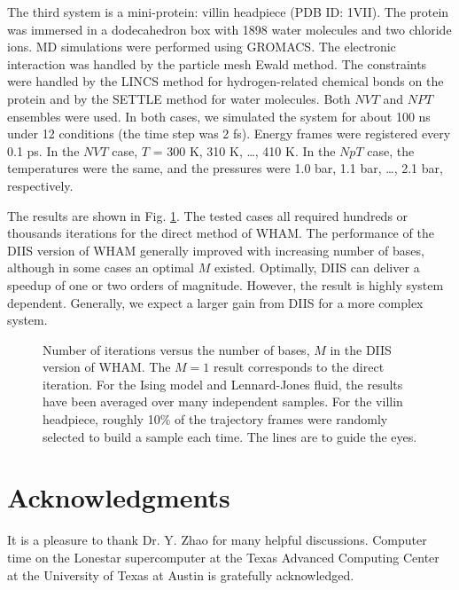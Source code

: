 \documentclass[aip,jcp,preprint,superscriptaddress]{revtex4-1}
\begin{document}
The third system is a mini-protein:
villin headpiece\cite{duan1998}
(PDB ID: 1VII).
%
The protein was immersed in
a dodecahedron box with 1898 water molecules and two chloride ions.
%
MD simulations were performed
using GROMACS\cite{
  berendsen1995, *lindahl2001, *vanderspoel2005, *hess2008}.
%
The electronic interaction was
handled by the particle mesh Ewald method\cite{
  essmann1995}.
%
The constraints were handled by the LINCS method\cite{
  hess1997}
for hydrogen-related chemical bonds on the protein
and by the SETTLE method\cite{
  miyamoto1992}
for water molecules.
%
Both $NVT$ and $NPT$ ensembles were used.
%
In both cases, we simulated the system
for about {\color{red} 100} ns
under 12 conditions
(the time step was 2 fs).
%
Energy frames were registered every 0.1 ps.
%
In the $NVT$ case,
$T$ = 300 K, 310 K, \dots, 410 K.
%
In the $NpT$ case,
the temperatures were the same,
and the pressures were
1.0 bar, 1.1 bar, \dots, 2.1 bar,
respectively.



The results are shown in Fig. \ref{fig:niter}.
%
The tested cases
all required hundreds or thousands iterations
for the direct method of WHAM.
%
The performance of the DIIS version of WHAM
generally improved with increasing number of bases,
although in some cases an optimal $M$ existed.
%
Optimally, DIIS can deliver a speedup of one or two orders of magnitude.
%
However, the result is highly system dependent.
%
Generally, we expect a larger gain from DIIS
for a more complex system.




\begin{figure}[h]
  \caption{
    \label{fig:niter}
    Number of iterations versus the number of bases, $M$
    in the DIIS version of WHAM.
    The $M = 1$ result corresponds to the direct iteration.
    For the Ising model and Lennard-Jones fluid,
    the results have been averaged over many independent samples.
    For the villin headpiece,
    roughly 10\% of the trajectory frames
    were randomly selected to build a sample each time.
    The lines are to guide the eyes.
  }
\end{figure}





\section{Acknowledgments}



It is a pleasure to thank Dr. Y. Zhao
for many helpful discussions.
%
Computer time on the Lonestar supercomputer
at the Texas Advanced Computing Center
at the University of Texas at Austin
is gratefully acknowledged.




\end{document}
